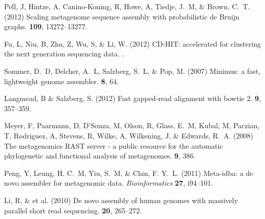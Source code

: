 \documentclass{pnastwo}
\begin{document}
\begin{article}
\begin{thebibliography}{1}
Pell, J, Hintze, A, Canino-Koning, R, Howe, A, Tiedje, J.~M,  \& Brown, C.~T.
\newblock (2012) {Scaling metagenome sequence assembly with probabilistic de
  Bruijn graphs}.
 {\bf 109}, 13272--13277.

Fu, L, Niu, B, Zhu, Z, Wu, S,  \& Li, W.
\newblock (2012) {CD-HIT: accelerated for clustering the next generation
  sequencing data.}
.

Sommer, D.~D, Delcher, A.~L, Salzberg, S.~L,  \& Pop, M.
\newblock (2007) Minimus: a fast, lightweight genome assembler.
 {\bf 8}, 64.

Langmead, B \& Salzberg, S.
\newblock (2012) Fast gapped-read alignment with bowtie 2.
 {\bf 9}, 357--359.

Meyer, F, Paarmann, D, D'Souza, M, Olson, R, Glass, E.~M, Kubal, M, Paczian, T,
  Rodriguez, A, Stevens, R, Wilke, A, Wilkening, J,  \& Edwards, R.~A.
\newblock (2008) {The metagenomics RAST server - a public resource for the
  automatic phylogenetic and functional analysis of metagenomes.}
 {\bf 9}, 386.

 Peng, Y, Leung, H. C.~M, Yiu, S.~M, \& Chin, F. Y.~L.
\newblock (2011) Meta-idba: a de novo assembler for metagenomic data. \newblock
{\em Bioinformatics} {\bf 27}, i94--101.



 Li, R, \& et al. \newblock
(2010) {De novo assembly of human genomes with massively parallel short read
sequencing}.  {\bf 20}, 265--272.
\end{thebibliography}
\end{article}

\renewcommand{\thepage}{S\arabic{page}}  
\renewcommand{\thesection}{S\arabic{section}}   
\renewcommand{\thetable}{S\arabic{table}}   
\renewcommand{\thefigure}{S\arabic{figure}}
\
\end{document}
